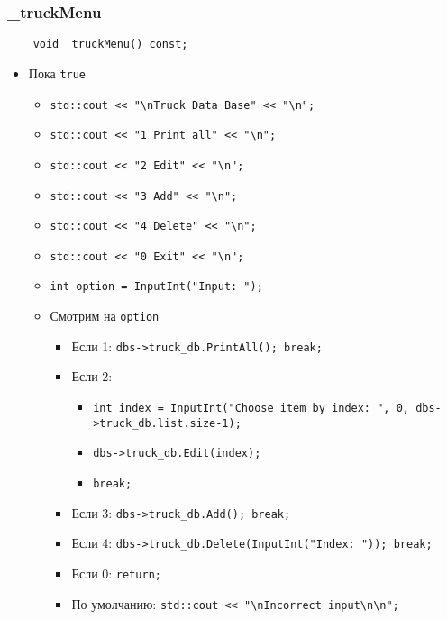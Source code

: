 \subsubsection{\_truckMenu}

\begin{lstlisting}
    void _truckMenu() const;
\end{lstlisting}

\begin{itemize}
    \item Пока \verb|true|
    \begin{itemize}
        \item \verb|std::cout << "\nTruck Data Base" << "\n";|
        \item \verb|std::cout << "1 Print all" << "\n";|
        \item \verb|std::cout << "2 Edit" << "\n";|
        \item \verb|std::cout << "3 Add" << "\n";|
        \item \verb|std::cout << "4 Delete" << "\n";|
        \item \verb|std::cout << "0 Exit" << "\n";|
        \item \verb|int option = InputInt("Input: ");|
        \item Смотрим на \verb|option|
        \begin{itemize}
            \item Если 1: \verb|dbs->truck_db.PrintAll(); break;|
            \item Если 2: 
            \begin{itemize}
                \item \verb|int index = InputInt("Choose item by index: ", 0, dbs->truck_db.list.size-1);|
                \item \verb|dbs->truck_db.Edit(index);|
                \item \verb|break;|
            \end{itemize}
            \item Если 3: \verb|dbs->truck_db.Add(); break;|
            \item Если 4: \verb|dbs->truck_db.Delete(InputInt("Index: ")); break;|
            \item Если 0: \verb|return;|
            \item По умолчанию: \verb|std::cout << "\nIncorrect input\n\n";|
        \end{itemize}
    \end{itemize}
\end{itemize}

